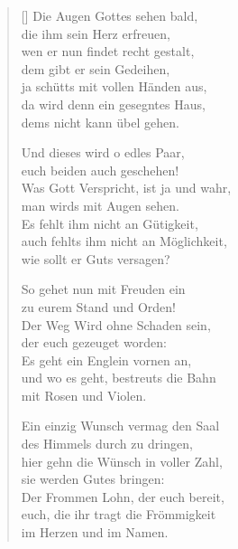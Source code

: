 \begin{multicols}{2}
\begin{verse}[\versewidth]
 Die Augen Gottes sehen bald,\\
die ihm sein Herz erfreuen,\\
wen er nun findet recht gestalt,\\
dem gibt er sein Gedeihen,\\
ja schütts mit vollen Händen aus,\\
da wird denn ein gesegntes Haus,\\
dems nicht kann übel gehen.

 Und dieses wird o edles Paar,\\
euch beiden auch geschehen!\\
Was Gott Verspricht, ist ja und wahr,\\
man wirds mit Augen sehen.\\
Es fehlt ihm nicht an Gütigkeit,\\
auch fehlts ihm nicht an Möglichkeit,\\
wie sollt er Guts versagen?

 So gehet nun mit Freuden ein\\
zu eurem Stand und Orden!\\
Der Weg Wird ohne Schaden sein,\\
der euch gezeuget worden:\\
Es geht ein Englein vornen an,\\
und wo es geht, bestreuts die Bahn\\
mit Rosen und Violen.

 Ein einzig Wunsch vermag den Saal\\
des Himmels durch zu dringen,\\
hier gehn die Wünsch in voller Zahl,\\
sie werden Gutes bringen:\\
Der Frommen Lohn, der euch bereit,\\
euch, die ihr tragt die Frömmigkeit\\
im Herzen und im Namen.

\end{verse}
\end{multicols}
